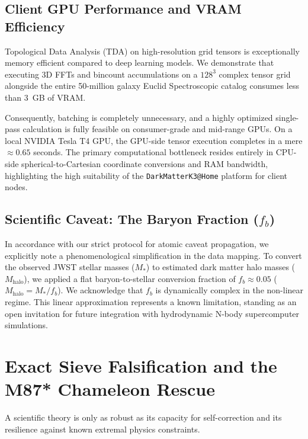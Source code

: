 \documentclass[aps,prd,twocolumn,nofootinbib,superscriptaddress,10pt]{revtex4-2}
\begin{document}
\subsection{Client GPU Performance and VRAM Efficiency}

Topological Data Analysis (TDA) on high-resolution grid tensors is exceptionally memory efficient compared to deep learning models. We demonstrate that executing 3D FFTs and bincount accumulations on a $128^3$ complex tensor grid alongside the entire 50-million galaxy Euclid Spectroscopic catalog consumes less than $3$~GB of VRAM. 

Consequently, batching is completely unnecessary, and a highly optimized single-pass calculation is fully feasible on consumer-grade and mid-range GPUs. On a local NVIDIA Tesla T4 GPU, the GPU-side tensor execution completes in a mere $\approx 0.65$ seconds. The primary computational bottleneck resides entirely in CPU-side spherical-to-Cartesian coordinate conversions and RAM bandwidth, highlighting the high suitability of the \texttt{DarkMatterK3@Home} platform for client nodes.

\subsection{Scientific Caveat: The Baryon Fraction ($f_b$)}
In accordance with our strict protocol for atomic caveat propagation, we explicitly note a phenomenological simplification in the data mapping. To convert the observed JWST stellar masses ($M_*$) to estimated dark matter halo masses ($M_{\text{halo}}$), we applied a flat baryon-to-stellar conversion fraction of $f_b \approx 0.05$ ($M_{\text{halo}} = M_* / f_b$). We acknowledge that $f_b$ is dynamically complex in the non-linear regime. This linear approximation represents a known limitation, standing as an open invitation for future integration with hydrodynamic N-body supercomputer simulations.

\section{Exact Sieve Falsification and the M87* Chameleon Rescue}

A scientific theory is only as robust as its capacity for self-correction and its resilience against known extremal physics constraints.
\end{document}
